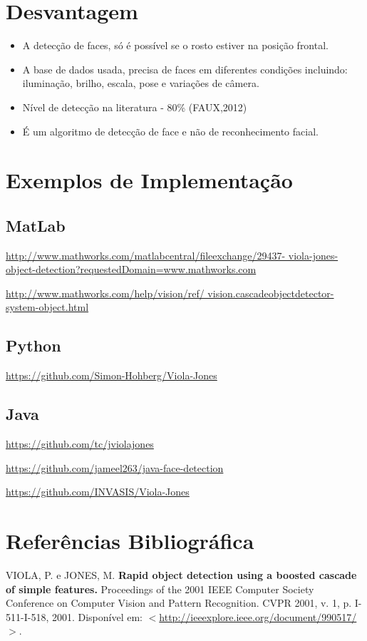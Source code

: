 \documentclass[12pt,a4paper]{article}
\begin{document}
\section{Desvantagem}
\begin{itemize}
	\item A detecção de faces, só é possível se o rosto estiver na posição frontal.
	\item A base de dados usada, precisa de faces em diferentes condições incluindo: iluminação, brilho, escala, pose e variações de câmera.
	\item Nível de detecção na literatura - 80\% (FAUX,2012)
	\item É um algoritmo de detecção de face e não de reconhecimento facial.
\end{itemize}

\section{Exemplos de Implementação}
\subsection{MatLab}
\url{http://www.mathworks.com/matlabcentral/fileexchange/29437- viola-jones-object-detection?requestedDomain=www.mathworks.com}

\url{http://www.mathworks.com/help/vision/ref/ vision.cascadeobjectdetector-system-object.html}

\subsection{Python}
\url{https://github.com/Simon-Hohberg/Viola-Jones}

\subsection{Java}

\url{https://github.com/tc/jviolajones}

\url{https://github.com/jameel263/java-face-detection}

\url{https://github.com/INVASIS/Viola-Jones}


 





\newpage
\section{Referências Bibliográfica}
\noindent VIOLA, P. e JONES, M.\textbf{ Rapid object detection using a boosted cascade of simple features.} Proceedings of the 2001 IEEE Computer Society Conference on Computer Vision and Pattern Recognition. CVPR 2001, v. 1, p. I-511-I-518, 2001. Disponível em: $<$\url{http://ieeexplore.ieee.org/document/990517/}$>$.\\\vspace{0.2cm}
\end{document}

